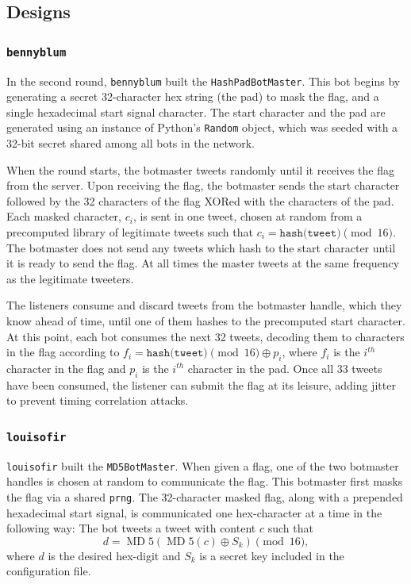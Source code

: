 \documentclass[11pt, oneside]{article} %
\numberwithin{equation}{section} %
\numberwithin{figure}{section} %
\numberwithin{table}{section} %
\renewcommand{\c}[1]{\texttt{#1}}
\newcommand{\teambb}{\c{bennyblum}}
\newcommand{\teamol}{\c{louisofir}}
\DeclareMathOperator{\MD}{MD}
\begin{document}
		
	\subsection{Designs}
		
		\subsubsection{\teambb{}}
        	In the second round, \teambb{} built the \c{HashPadBotMaster}. This bot begins by generating a secret 32-character hex string (the pad) to mask the flag, and a single hexadecimal start signal character. The start character and the pad are generated using an instance of Python's \c{Random} object, which was seeded with a 32-bit secret shared among all bots in the network.
        	
            When the round starts, the botmaster tweets randomly until it receives the flag from the server. Upon receiving the flag, the botmaster sends the start character followed by the 32 characters of the flag XORed with the characters of the pad. Each masked character, $c_i$, is sent in one tweet, chosen at random from a precomputed library of legitimate tweets such that $c_i = \c{hash(tweet)} \pmod{16}$. The botmaster does not send any tweets which hash to the start character until it is ready to send the flag. At all times the master tweets at the same frequency as the legitimate tweeters.
        	
            The listeners consume and discard tweets from the botmaster handle, which they know ahead of time, until one of them hashes to the precomputed start character. At this point, each bot consumes the next 32 tweets, decoding them to characters in the flag according to $f_i = \c{hash(tweet)} \pmod{16} \oplus p_i$, where $f_i$ is the $i^{th}$ character in the flag and $p_i$ is the $i^{th}$ character in the pad. Once all 33 tweets have been consumed, the listener can submit the flag at its leisure, adding jitter to prevent timing correlation attacks.
		
        \subsubsection{\teamol{}}
			\teamol{} built the \c{MD5BotMaster}. When given a flag, one of the two botmaster handles is chosen at random to communicate the flag. This botmaster first masks the flag via a shared \c{prng}. The 32-character masked flag, along with a prepended hexadecimal start signal, is communicated one hex-character at a time in the following way: The bot tweets a tweet with content $c$ such that
			\[
				d=\MD5(\MD5(c)\oplus S_k) \pmod{16},
			\] 
			where $d$ is the desired hex-digit and $S_k$ is a secret key included in the configuration file.
\end{document}
